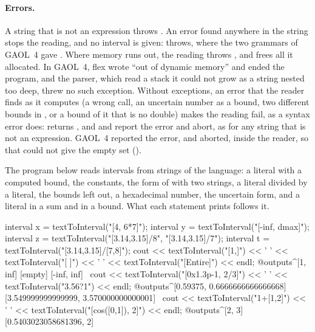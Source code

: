 \documentclass[12pt,a4paper,twoside,openright]{book}
\begin{document}
\paragraph{Errors.} A string that is not an expression throws
. An error found anywhere in the string stops
the reading, and no interval is given: 
throws, where the two grammars of GAOL~4 gave
\itv{-\infty}{+\infty}.\newinvfive{} Where memory runs out, the reading
throws , and frees all it allocated.\newinvfive{} In
GAOL~4, flex wrote ``out of dynamic memory'' and ended the program, and the
parser, which read a stack it could not grow as a string nested too deep,
threw no such exception. Without exceptions, an error that the reader finds
as it computes (a wrong call, an uncertain number as a bound, two different
bounds in , or a bound of it that is no double) makes the
reading fail, as a syntax error does:  returns
, and  and 
report the error and abort, as for any string that is not an
expression.\newinvfive{} GAOL~4 reported the error, and aborted, inside the
reader, so that  could not give the
empty set ().

\begin{Ex}
The program below reads intervals from strings of the language: a literal
with a computed bound, the constants, the form of 
with two strings, a literal divided by a literal, the bounds left out, a
hexadecimal number, the uncertain form, and a literal in a sum and in a
bound. What each statement prints follows it.
\begin{example}
interval x = textToInterval("[4, 6*7]");
interval y = textToInterval("[-inf, dmax]");
interval z = textToInterval("[3.14,3.15]/8", "[3.14,3.15]/7");
interval t = textToInterval("[3.14,3.15]/[7,8]");
cout << textToInterval("[1,]") << ' ' << textToInterval("[ ]") << ' '
     << textToInterval("[Entire]") << endl;
@outputs^[1, inf] [empty] [-inf, inf]~
cout << textToInterval("[0x1.3p-1, 2/3]") << ' '
     << textToInterval("3.56?1") << endl;
@outputs^[0.59375, 0.6666666666666668] [3.549999999999999, 3.570000000000001]~
cout << textToInterval("1+[1,2]") << ' '
     << textToInterval("[cos([0,1]), 2]") << endl;
@outputs^[2, 3] [0.5403023058681396, 2]~
\end{example}
\end{Ex}
\end{document}
